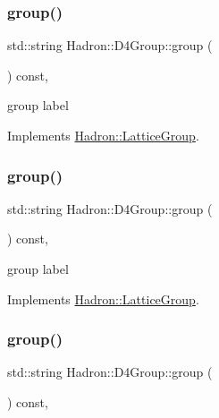 \subsubsection{\texorpdfstring{group()}{group()}\hspace{0.1cm}{\footnotesize\ttfamily [1/3]}}
{\footnotesize\ttfamily std\+::string Hadron\+::\+D4\+Group\+::group (\begin{DoxyParamCaption}{ }\end{DoxyParamCaption}) const\hspace{0.3cm}{\ttfamily [inline]}, {\ttfamily [virtual]}}

group label 

Implements \mbox{\hyperlink{structHadron_1_1LatticeGroup_a82208a322bf1b1db489f16af38e70087}{Hadron\+::\+Lattice\+Group}}.

\mbox{\label{structHadron_1_1D4Group_ae6c08a58023532bcf277f60c1dddde4f}} 
\subsubsection{\texorpdfstring{group()}{group()}\hspace{0.1cm}{\footnotesize\ttfamily [2/3]}}
{\footnotesize\ttfamily std\+::string Hadron\+::\+D4\+Group\+::group (\begin{DoxyParamCaption}{ }\end{DoxyParamCaption}) const\hspace{0.3cm}{\ttfamily [inline]}, {\ttfamily [virtual]}}

group label 

Implements \mbox{\hyperlink{structHadron_1_1LatticeGroup_a82208a322bf1b1db489f16af38e70087}{Hadron\+::\+Lattice\+Group}}.

\mbox{\label{structHadron_1_1D4Group_ae6c08a58023532bcf277f60c1dddde4f}} 
\subsubsection{\texorpdfstring{group()}{group()}\hspace{0.1cm}{\footnotesize\ttfamily [3/3]}}
{\footnotesize\ttfamily std\+::string Hadron\+::\+D4\+Group\+::group (\begin{DoxyParamCaption}{ }\end{DoxyParamCaption}) const\hspace{0.3cm}{\ttfamily [inline]}, {\ttfamily [virtual]}}

